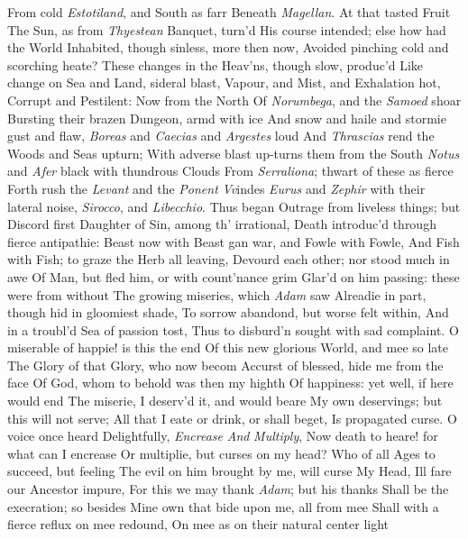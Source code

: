 \documentclass[11pt]{book}
\newcounter {first}
\newcounter {last}
\begin{document}
From cold \textit{Estotiland}, and South as farr 
Beneath \textit{Magellan}.  At that tasted Fruit 
The Sun, as from \textit{Thyestean} Banquet, turn'd 
His course intended; else how had the World 
Inhabited, though sinless, more then now, 
Avoided pinching cold and scorching heate? 
These changes in the Heav'ns, though slow, produc'd 
Like change on Sea and Land, sideral blast, 
Vapour, and Mist, and Exhalation hot, 
Corrupt and Pestilent: Now from the North 
Of \textit{Norumbega}, and the \textit{Samoed} shoar 
Bursting their brazen Dungeon, armd with ice 
And snow and haile and stormie gust and flaw, 
\textit{Boreas} and \textit{Caecias} and \textit{Argestes} loud 
And \textit{Thrascias} rend the Woods and Seas upturn; 
With adverse blast up-turns them from the South 
\textit{Notus} and \textit{Afer} black with thundrous Clouds 
From \textit{Serraliona}; thwart of these as fierce 
Forth rush the \textit{Levant} and the \textit{Ponent} \textit{Vv}indes 
\textit{Eurus} and \textit{Zephir} with their lateral noise, 
\textit{Sirocco}, and \textit{Libecchio}.  Thus began 
Outrage from liveless things; but Discord first 
Daughter of Sin, among th' irrational, 
Death introduc'd through fierce antipathie: 
Beast now with Beast gan war, and Fowle with Fowle, 
And Fish with Fish; to graze the Herb all leaving, 
Devourd each other; nor stood much in awe 
Of Man, but fled him, or with count'nance grim 
Glar'd on him passing: these were from without 
The growing miseries, which \textit{Adam} saw 
Alreadie in part, though hid in gloomiest shade, 
To sorrow abandond, but worse felt within, 
And in a troubl'd Sea of passion tost, 
Thus to disburd'n sought with sad complaint. 
\quad O miserable of happie! is this the end 
Of this new glorious World, and mee so late 
The Glory of that Glory, who now becom 
Accurst of blessed, hide me from the face 
Of God, whom to behold was then my highth 
Of happiness: yet well, if here would end 
The miserie, I deserv'd it, and would beare 
My own deservings; but this will not serve; 
All that I eate or drink, or shall beget, 
Is propagated curse.  O voice once heard 
Delightfully, \textit{Encrease} \textit{And} \textit{Multiply}, 
Now death to heare! for what can I encrease 
Or multiplie, but curses on my head? 
Who of all Ages to succeed, but feeling 
The evil on him brought by me, will curse 
My Head, Ill fare our Ancestor impure, 
For this we may thank \textit{Adam}; but his thanks 
Shall be the execration; so besides 
Mine own that bide upon me, all from mee 
Shall with a fierce reflux on mee redound, 
On mee as on their natural center light 
\end{document}
